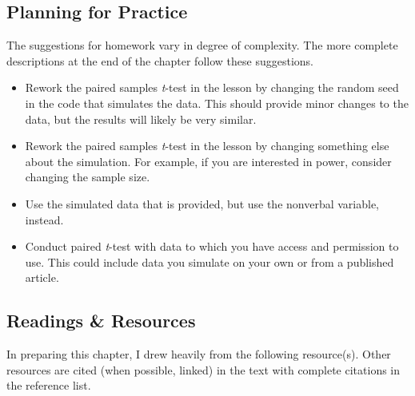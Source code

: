 \documentclass[
  11pt,
]{book}
\providecommand{\tightlist}{%
  \setlength{\itemsep}{0pt}\setlength{\parskip}{0pt}}
\begin{document}
\hypertarget{planning-for-practice-3}{%
\subsection{Planning for Practice}\label{planning-for-practice-3}}

The suggestions for homework vary in degree of complexity. The more complete descriptions at the end of the chapter follow these suggestions.

\begin{itemize}
\tightlist
\item
  Rework the paired samples \emph{t}-test in the lesson by changing the random seed in the code that simulates the data. This should provide minor changes to the data, but the results will likely be very similar.
\item
  Rework the paired samples \emph{t}-test in the lesson by changing something else about the simulation. For example, if you are interested in power, consider changing the sample size.
\item
  Use the simulated data that is provided, but use the nonverbal variable, instead.
\item
  Conduct paired \emph{t}-test with data to which you have access and permission to use. This could include data you simulate on your own or from a published article.
\end{itemize}

\hypertarget{readings-resources-3}{%
\subsection{Readings \& Resources}\label{readings-resources-3}}

In preparing this chapter, I drew heavily from the following resource(s). Other resources are cited (when possible, linked) in the text with complete citations in the reference list.
\end{document}
